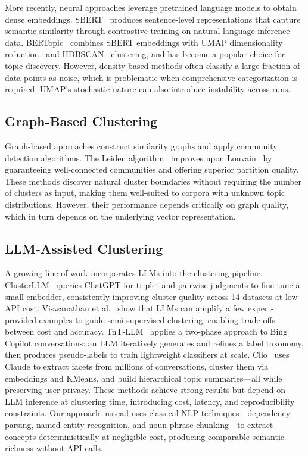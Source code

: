 \documentclass[conference]{IEEEtran}
\begin{document}
More recently, neural approaches leverage pretrained language models to obtain dense embeddings. SBERT~\cite{reimers2019sbert} produces sentence-level representations that capture semantic similarity through contrastive training on natural language inference data. BERTopic~\cite{grootendorst2022bertopic} combines SBERT embeddings with UMAP dimensionality reduction~\cite{mcinnes2018umap} and HDBSCAN~\cite{campello2013hdbscan} clustering, and has become a popular choice for topic discovery. However, density-based methods often classify a large fraction of data points as noise, which is problematic when comprehensive categorization is required. UMAP's stochastic nature can also introduce instability across runs.

\subsection{Graph-Based Clustering}

Graph-based approaches construct similarity graphs and apply community detection algorithms. The Leiden algorithm~\cite{traag2019leiden} improves upon Louvain~\cite{blondel2008louvain} by guaranteeing well-connected communities and offering superior partition quality. These methods discover natural cluster boundaries without requiring the number of clusters as input, making them well-suited to corpora with unknown topic distributions. However, their performance depends critically on graph quality, which in turn depends on the underlying vector representation.

\subsection{LLM-Assisted Clustering}

A growing line of work incorporates LLMs into the clustering pipeline. ClusterLLM~\cite{zhang2023clusterllm} queries ChatGPT for triplet and pairwise judgments to fine-tune a small embedder, consistently improving cluster quality across 14 datasets at low API cost. Viswanathan et al.~\cite{viswanathan2024fewshot} show that LLMs can amplify a few expert-provided examples to guide semi-supervised clustering, enabling trade-offs between cost and accuracy. TnT-LLM~\cite{wan2024tntllm} applies a two-phase approach to Bing Copilot conversations: an LLM iteratively generates and refines a label taxonomy, then produces pseudo-labels to train lightweight classifiers at scale. Clio~\cite{tamkin2024clio} uses Claude to extract facets from millions of conversations, cluster them via embeddings and KMeans, and build hierarchical topic summaries---all while preserving user privacy. These methods achieve strong results but depend on LLM inference at clustering time, introducing cost, latency, and reproducibility constraints. Our approach instead uses classical NLP techniques---dependency parsing, named entity recognition, and noun phrase chunking---to extract concepts deterministically at negligible cost, producing comparable semantic richness without API calls.
\end{document}
